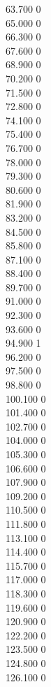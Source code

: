{ 63.700	0 \\
 65.000	0 \\
 66.300	0 \\
 67.600	0 \\
 68.900	0 \\
 70.200	0 \\
 71.500	0 \\
 72.800	0 \\
 74.100	0 \\
 75.400	0 \\
 76.700	0 \\
 78.000	0 \\
 79.300	0 \\
 80.600	0 \\
 81.900	0 \\
 83.200	0 \\
 84.500	0 \\
 85.800	0 \\
 87.100	0 \\
 88.400	0 \\
 89.700	0 \\
 91.000	0 \\
 92.300	0 \\
 93.600	0 \\
 94.900	1 \\
 96.200	0 \\
 97.500	0 \\
 98.800	0 \\
 100.100	0 \\
 101.400	0 \\
 102.700	0 \\
 104.000	0 \\
 105.300	0 \\
 106.600	0 \\
 107.900	0 \\
 109.200	0 \\
 110.500	0 \\
 111.800	0 \\
 113.100	0 \\
 114.400	0 \\
 115.700	0 \\
 117.000	0 \\
 118.300	0 \\
 119.600	0 \\
 120.900	0 \\
 122.200	0 \\
 123.500	0 \\
 124.800	0 \\
 126.100	0 \\
}
